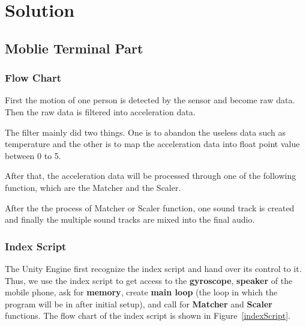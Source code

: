 \section{Solution}

\subsection{Moblie Terminal Part}

\subsubsection{Flow Chart}

   First the motion of one person is detected by the sensor and become raw data.
   Then the raw data is filtered into acceleration data. 

   The filter mainly did two things.
   One is to abandon the useless data such as temperature and the other is to
   map the acceleration data into float point value between 0 to 5. 

   After that, the acceleration data will be processed through one of the
   following function, which are the Matcher and the Scaler. 

   After the the process of Matcher or Scaler function, one sound track is
   created and finally the multiple sound tracks are mixed into the final audio.

\subsubsection{Index Script}

The Unity Engine first recognize the index script and hand over its control to
it.  
Thus, we use the index script to get access to the 
\textbf{gyroscope}, \textbf{speaker} of the mobile phone, 
 ask for \textbf{memory}, create \textbf{main loop} (the loop in which the
 program will be in after initial setup), and call for 
\textbf{Matcher} and \textbf{Scaler} functions. 
The flow chart of the index script is shown in Figure~\ref{indexScript}.

